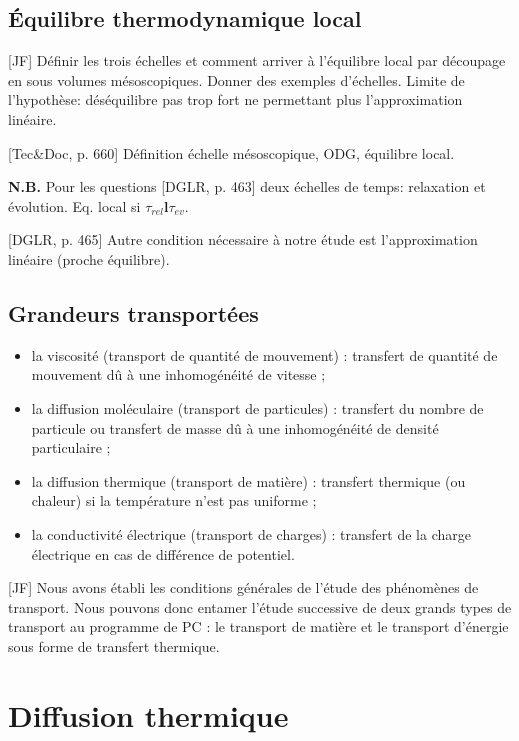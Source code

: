 \documentclass[11pt]{report}
\numberwithin{figure}{section}
\numberwithin{equation}{section}
\numberwithin{table}{section}
\renewcommand{\ll}{\boldsymbol{l}}
\newcommand{\1}{\boldsymbol{1}}
\begin{document}
\subsection{Équilibre thermodynamique local}

[JF] Définir les trois échelles et comment arriver à l'équilibre local par découpage en sous volumes mésoscopiques. Donner des exemples d'échelles. Limite de l'hypothèse: déséquilibre pas trop fort ne permettant plus l'approximation linéaire.


[Tec\&Doc, p. 660] Définition échelle mésoscopique, ODG, équilibre local. 

\textbf{N.B.} Pour les questions [DGLR, p. 463] deux échelles de temps: relaxation et évolution. Eq. local si $\tau_{rel} \ll \tau_{ev}$.

[DGLR, p. 465] Autre condition nécessaire à notre étude est l'approximation linéaire (proche équilibre).

\subsection{Grandeurs transportées}

\begin{itemize}
\item la viscosité (transport de quantité de mouvement) : transfert de quantité de mouvement dû à une inhomogénéité de vitesse ;
\item la diffusion moléculaire (transport de particules) : transfert du nombre de particule ou transfert de masse dû à une inhomogénéité de densité particulaire ;
\item la diffusion thermique (transport de matière) : transfert thermique (ou chaleur) si la température n'est pas uniforme ;
\item la conductivité électrique (transport de charges) : transfert de la charge électrique en cas de différence de potentiel.
\end{itemize}

[JF] Nous avons établi les conditions générales de l’étude des phénomènes de transport. Nous pouvons donc entamer l’étude successive de deux grands types de transport au programme de PC : le transport de matière et le transport d’énergie sous forme de transfert thermique.

\section{Diffusion thermique}
\end{document}

